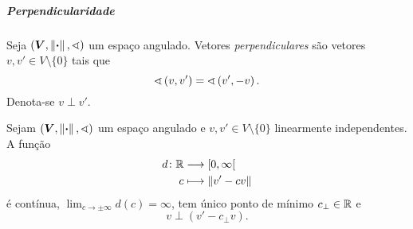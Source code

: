 \subparagraph{Perpendicularidade}


\begin{definition}
Seja $(\bm V, \left\Vert{\bm{\cdot}}\right\Vert,\sphericalangle)$ um espaço angulado. Vetores \emph{perpendiculares} são vetores $v,v' \in V \setminus \{0\}$ tais que
	\begin{equation*}
	\sphericalangle\left({v},{v'}\right) = \sphericalangle\left({v'},{-v}\right).
	\end{equation*}
Denota-se $v \perp v'$.
\end{definition}

\begin{proposition}[Perpendicular]
Sejam $(\bm V, \left\Vert{\bm{\cdot}}\right\Vert,\sphericalangle)$ um espaço angulado e $v,v' \in V \setminus \{0\}$ linearmente independentes. A função
	\begin{align*}
		{d}\colon {\mathbb{R}} &\longrightarrow {\left[0,\allowbreak \infty\right[} \\{c} &\longmapsto \left\Vert{v'-cv}\right\Vert
	\end{align*}
é contínua, $\lim_{c \to \pm\infty} d(c) = \infty$, tem único ponto de mínimo $c_{\perp} \in \mathbb{R}$ e
	\begin{equation*}
		v \perp (v'-c_{\perp}v).
	\end{equation*}
\end{proposition}
